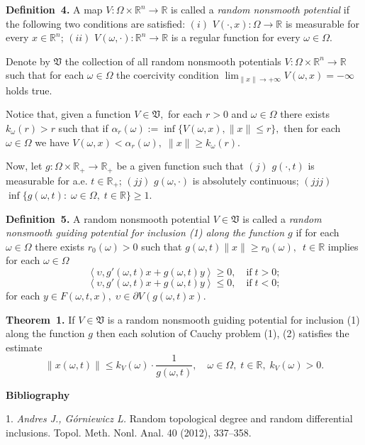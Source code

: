 \textbf{Definition~4.}
A map $V\colon\Omega\times\mathbb{R}^{n}\to\mathbb{R}$ is called a {\it random nonsmooth potential} if the following two conditions are satisfied:
$(i)$ $V(\cdot,x)\colon\Omega\to\mathbb{R}$ is measurable for every $x\in\mathbb{R}^{n}$; \linebreak
$(ii)$ $V(\omega,\cdot)\colon\mathbb{R}^{n}\to\mathbb{R}$ is a regular function for every $\omega\in\Omega$.

\noindent Denote by $\mathfrak{V}$ the collection of all random nonsmooth potentials $V: \Omega\times\mathbb{R}^n \to \mathbb{R}$ such that for each $\omega\in\Omega$ the coercivity condition
$
\lim_{\|x\|\to +\infty} V(\omega,x) = -\infty
$
holds true.

Notice that, given a function $V \in \mathfrak{V},$ for each $r>0$ and $\omega\in\Omega$ there exists $k_\omega(r) > r$ such that
if
$
\alpha_r(\omega):=\inf\{V(\omega,x),\|x\|\leq r\},
$
then for each $\omega\in\Omega$ we have
$
 V(\omega,x)< \alpha_r(\omega), \;\|x\|\geq k_\omega(r).
$

Now, let $g:\Omega\times\mathbb{R}_+\to \mathbb{R}_+$ be a given function such that
$(j)$ $g(\cdot, t)$ is measurable for a.e. $t\in\mathbb{R}_+$;
$(jj)$ $g(\omega, \cdot)$ is absolutely continuous;
$(jjj)$ $\inf \{g(\omega,t):\; \omega\in\Omega,\; t\in \mathbb{R}\}\geq 1$.

\textbf{Definition~5.} A random nonsmooth potential $V \in \mathfrak{V}$ is called a {\it random nonsmooth guiding potential for inclusion (1) along the function $g$} if for each $\omega\in\Omega$ there exists $r_0(\omega)>0$ such that $g(\omega,t)\|x\|\ge r_0(\omega),$ \,$t \in \mathbb{R}$ implies for each $\omega\in\Omega$
$$
\left< {\upsilon,g'(\omega,t)x+g(\omega,t)y} \right> \geq 0, \quad \mbox {if} \; t>0;
$$
$$
\left< {\upsilon,g'(\omega,t)x+g(\omega,t)y} \right> \leq 0, \quad \mbox {if}\; t<0;
$$
for each $y\in F(\omega,t,x), \; \upsilon \in \partial V(g(\omega,t)x).$

\textbf{Theorem~1.}
If $V \in \mathfrak{V}$ is a random nonsmooth guiding potential for inclusion (1) along the function $g$
then each solution of Cauchy problem (1), (2) satisfies the estimate
$$
\|x(\omega,t)\|\leq k_V(\omega)\cdot \frac{1}{g(\omega,t)},\quad \omega\in\Omega,\;t\in \mathbb{R}, \; k_V(\omega)>0.
$$
\centerline {\bf Bibliography}

1. {\it Andres J., G\'orniewicz L.} Random topological degree and random differential inclusions. Topol. Meth. Nonl. Anal. 40 (2012), 337--358.

